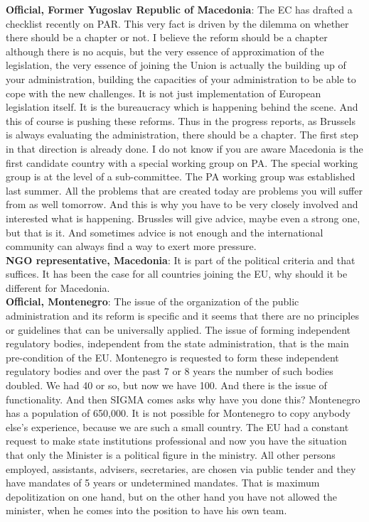 \textbf{Official, Former Yugoslav Republic of Macedonia}: The EC has drafted a checklist recently on PAR. This very fact is driven by the dilemma on whether there should be a chapter or not. I believe the reform should be a chapter although there is no acquis, but the very essence of approximation of the legislation, the very essence of joining the Union is actually the building up of your administration, building the capacities of your administration to be able to cope with the new challenges. It is not just implementation of European legislation itself. It is the bureaucracy which is happening behind the scene. And this of course is pushing these reforms. Thus in the progress reports, as Brussels is always evaluating the administration, there should be a chapter. The first step in that direction is already done. I do not know if you are aware Macedonia is the first candidate country with a special working group on PA. The special working group is at the level of a sub-committee. The PA working group was established last summer. All the problems that are created today are problems you will suffer from as well tomorrow. And this is why you have to be very closely involved and interested what is happening. Brussles will give advice, maybe even a strong one, but that is it. And sometimes advice is not enough and the international community can always find a way to exert more pressure. \\
\textbf{NGO representative, Macedonia}: It is part of the political criteria and that suffices. It has been the case for all countries joining the EU, why should it be different for Macedonia. \\
\textbf{Official, Montenegro}: The issue of the organization of the public administration and its reform is specific and it seems that there are no principles or guidelines that can be universally applied. The issue of forming independent regulatory bodies, independent from the state administration, that is the main pre-condition of the EU. Montenegro is requested to form these independent regulatory bodies and over the past 7 or 8 years the number of such bodies doubled. We had 40 or so, but now we have 100. And there is the issue of functionality. And then SIGMA comes asks why have you done this? Montenegro has a population of 650,000. It is not possible for Montenegro to copy anybody else’s experience, because we are such a small country. The EU had a constant request to make state institutions professional and now you have the situation that only the Minister is a political figure in the ministry. All other persons employed, assistants, advisers, secretaries, are chosen via public tender and they have mandates of 5 years or undetermined mandates. That is maximum depolitization on one hand, but on the other hand you have not allowed the minister, when he comes into the position to have his own team.  \\
